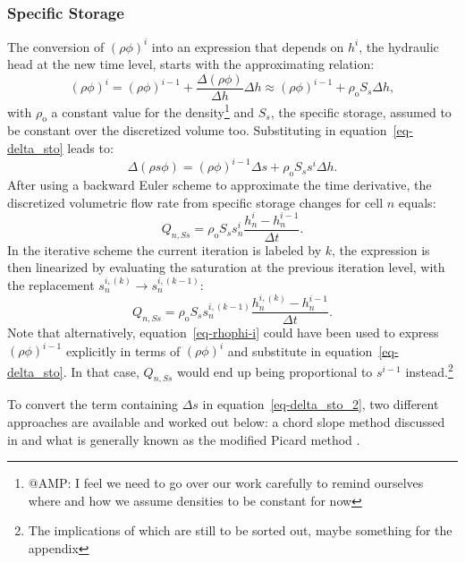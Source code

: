 \documentclass[fleqn]{article}
\begin{document}
\subsubsection*{Specific Storage}
The conversion of $(\rho\phi)^i$ into an expression that depends
on $h^i$, the hydraulic head at the new time level, starts with 
the approximating relation:
\begin{equation}
  (\rho\phi)^i =
  (\rho\phi)^{i-1} + \frac{\Delta (\rho\phi)}{\Delta h} \Delta h \approx
  (\rho\phi)^{i-1} + \rho_\textrm{o} S_s \Delta h,
  \label{eq-rhophi-i}
\end{equation}
with $\rho_{\textrm{o}}$ a constant value for the density\footnote{@AMP: 
I feel we need to go over our work carefully to remind ourselves
where and how we assume densities to be constant for now}
and $S_s$, the specific storage, assumed to be constant over
the discretized volume too. Substituting in equation~\ref{eq-delta_sto}
leads to:
\begin{equation}
  \Delta \left ( \rho s \phi \right ) =
  (\rho \phi)^{i-1}\Delta s +
  \rho_{\textrm{o}} S_s s^i \Delta h.
  \label{eq-delta_sto_2}
\end{equation}
After using a backward Euler scheme to approximate the time
derivative, the discretized volumetric flow rate from specific
storage changes for cell $n$ equals:
\begin{equation}
  Q_{n,Ss} = \rho_{\textrm{o}} S_s s_n^i
  \frac{h_n^i - h_n^{i-1}}{\Delta t}.
\end{equation}
In the iterative scheme the current iteration is labeled
by $k$, the expression is then linearized by evaluating
the saturation at the previous iteration level, with the
replacement $s_n^{i,(k)} \rightarrow s_n^{i,(k-1)}$:
\begin{equation}
  Q_{n,Ss} = \rho_{\textrm{o}} S_s s_n^{i,(k-1)} 
  \frac{h_n^{i,(k)} - h_n^{i-1}}{\Delta t}.
\end{equation}
Note that alternatively, equation~\ref{eq-rhophi-i} could have
been used to express $(\rho\phi)^{i-1}$ explicitly in terms 
of $(\rho\phi)^i$ and substitute in equation~\ref{eq-delta_sto}. 
In that case, $Q_{n,Ss}$ would end up being proportional to 
$s^{i-1}$ instead.\footnote{The implications of which are still
to be sorted out, maybe something for the appendix}

To convert the term containing $\Delta s$ in 
equation~\ref{eq-delta_sto_2}, two different 
approaches are available and worked out below: 
a chord slope method discussed in \cite{rathfelder-1994}
and what is generally known as the modified Picard method
\cite{celia-1990}.
\end{document}
